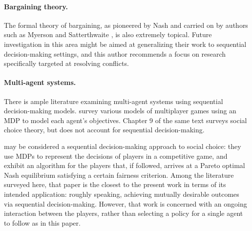 \documentclass{article}
\begin{document}
\paragraph{Bargaining theory.} The formal theory of bargaining, as pioneered by Nash \citep{nash1950bargaining} and carried on by authors such as Myerson \citep{myerson1979incentive} \citep{myerson2013game} and Satterthwaite \citep{myerson1983efficient}, is also extremely topical.  Future investigation in this area might be aimed at generalizing their work to sequential decision-making settings, and this author recommends a focus on research specifically targeted at resolving conflicts.

\paragraph{Multi-agent systems.} There is ample literature examining multi-agent systems using sequential decision-making models.  \citet{shoham2008multiagent} survey various models of multiplayer games using an MDP to model each agent's objectives.  Chapter 9 of the same text surveys social choice theory, but does not account for sequential decision-making.  

\citet{zhang2014fairness} may be considered a sequential decision-making approach to social choice: they use MDPs to represent the decisions of players in a competitive game, and exhibit an algorithm for the players that, if followed, arrives at a Pareto optimal Nash equilibrium satisfying a certain fairness criterion.  Among the literature surveyed here, that paper is the closest to the present work in terms of its intended application: roughly speaking, achieving mutually desirable outcomes via sequential decision-making.  However, that work is concerned with an ongoing interaction between the players, rather than selecting a policy for a single agent to follow as in this paper.  

\end{document}
